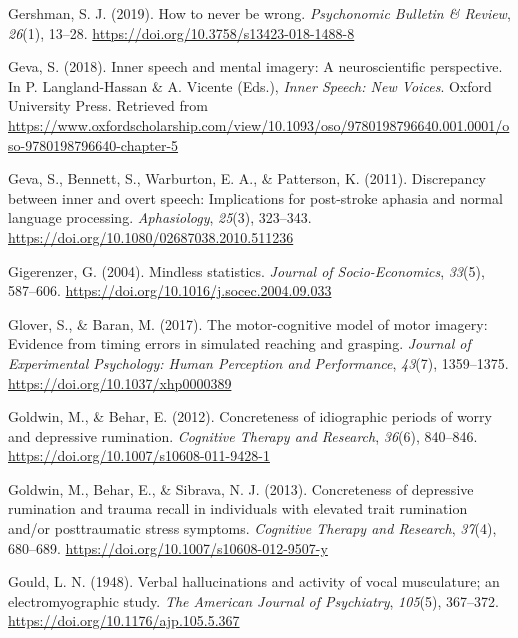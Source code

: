 \documentclass[a4paper,12pt,twoside,onecolumn,openright,final,oldfontcommands]{memoir}
\begin{document}
\leavevmode\hypertarget{ref-gershman_how_2019}{}%
Gershman, S. J. (2019). How to never be wrong. \emph{Psychonomic Bulletin \& Review}, \emph{26}(1), 13--28. \url{https://doi.org/10.3758/s13423-018-1488-8}

\leavevmode\hypertarget{ref-geva_inner_2018}{}%
Geva, S. (2018). Inner speech and mental imagery: A neuroscientific perspective. In P. Langland-Hassan \& A. Vicente (Eds.), \emph{Inner Speech: New Voices}. Oxford University Press. Retrieved from \url{https://www.oxfordscholarship.com/view/10.1093/oso/9780198796640.001.0001/oso-9780198796640-chapter-5}

\leavevmode\hypertarget{ref-geva_discrepancy_2011}{}%
Geva, S., Bennett, S., Warburton, E. A., \& Patterson, K. (2011). Discrepancy between inner and overt speech: Implications for post-stroke aphasia and normal language processing. \emph{Aphasiology}, \emph{25}(3), 323--343. \url{https://doi.org/10.1080/02687038.2010.511236}

\leavevmode\hypertarget{ref-Gigerenzer2004}{}%
Gigerenzer, G. (2004). Mindless statistics. \emph{Journal of Socio-Economics}, \emph{33}(5), 587--606. \url{https://doi.org/10.1016/j.socec.2004.09.033}

\leavevmode\hypertarget{ref-glover_motor-cognitive_2017}{}%
Glover, S., \& Baran, M. (2017). The motor-cognitive model of motor imagery: Evidence from timing errors in simulated reaching and grasping. \emph{Journal of Experimental Psychology: Human Perception and Performance}, \emph{43}(7), 1359--1375. \url{https://doi.org/10.1037/xhp0000389}

\leavevmode\hypertarget{ref-goldwin_concreteness_2012}{}%
Goldwin, M., \& Behar, E. (2012). Concreteness of idiographic periods of worry and depressive rumination. \emph{Cognitive Therapy and Research}, \emph{36}(6), 840--846. \url{https://doi.org/10.1007/s10608-011-9428-1}

\leavevmode\hypertarget{ref-goldwin_concreteness_2013}{}%
Goldwin, M., Behar, E., \& Sibrava, N. J. (2013). Concreteness of depressive rumination and trauma recall in individuals with elevated trait rumination and/or posttraumatic stress symptoms. \emph{Cognitive Therapy and Research}, \emph{37}(4), 680--689. \url{https://doi.org/10.1007/s10608-012-9507-y}

\leavevmode\hypertarget{ref-gould_verbal_1948}{}%
Gould, L. N. (1948). Verbal hallucinations and activity of vocal musculature; an electromyographic study. \emph{The American Journal of Psychiatry}, \emph{105}(5), 367--372. \url{https://doi.org/10.1176/ajp.105.5.367}
\end{document}
